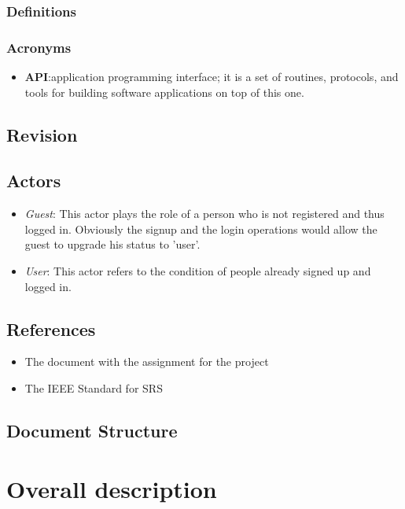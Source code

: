 \documentclass{article}
\begin{document}
\subsubsection{Definitions}


\subsubsection{Acronyms}
\begin{itemize}
	\item \textbf{API}:\@ application programming interface; it is a set of routines, protocols, and tools for building software applications on top of this one.
\end{itemize}
\subsection{Revision}



\subsection{Actors}
\begin{itemize}
	\item \textit{Guest}: This actor plays the role of a person who is not registered and thus logged in. Obviously the signup and the login operations would allow the guest to upgrade his status to 'user'.
	\item \textit{User}: This actor refers to the condition of people already signed up and logged in. 

\end{itemize}

\subsection{References}
\begin{itemize}
	\item The document with the assignment for the project
	\item The IEEE Standard for SRS 
\end{itemize}
\subsection{Document Structure}


\clearpage
\section{Overall description}
\end{document}

